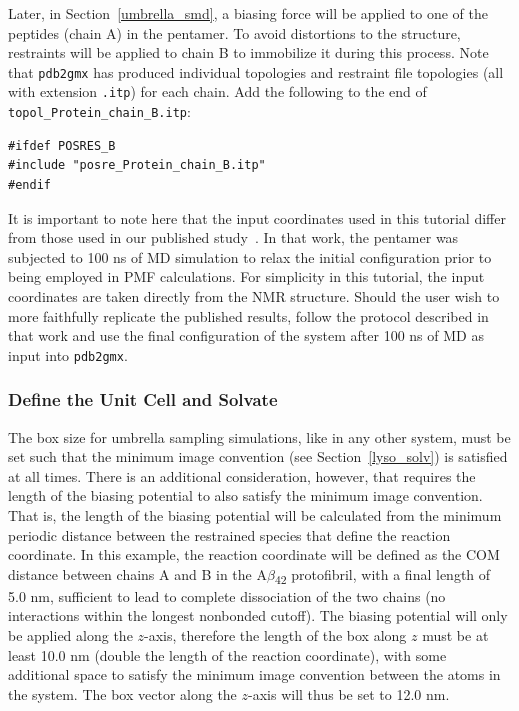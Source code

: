\documentclass[9pt,tutorial,pubversion]{livecoms}
\begin{document}
Later, in Section~\ref{umbrella_smd}, a biasing force will be applied to one of the peptides (chain A) in the pentamer. To avoid distortions to the structure, restraints will be applied to chain B to immobilize it during this process. Note that \texttt{pdb2gmx} has produced individual topologies and restraint file topologies (all with extension \texttt{.itp}) for each chain. Add the following to the end of \texttt{topol\_Protein\_chain\_B.itp}:

\begin{lstlisting}
#ifdef POSRES_B
#include "posre_Protein_chain_B.itp"
#endif
\end{lstlisting}

It is important to note here that the input coordinates used in this tutorial differ from those used in our published study~\cite{Lemkul2010}. In that work, the pentamer was subjected to 100 ns of MD simulation to relax the initial configuration prior to being employed in PMF calculations. For simplicity in this tutorial, the input coordinates are taken directly from the NMR structure. Should the user wish to more faithfully replicate the published results, follow the protocol described in that work and use the final configuration of the system after 100 ns of MD as input into \texttt{pdb2gmx}.

\subsubsection{Define the Unit Cell and Solvate} \label{umbrella_box}

The box size for umbrella sampling simulations, like in any other system, must be set such that the minimum image convention (see Section~\ref{lyso_solv}) is satisfied at all times. There is an additional consideration, however, that requires the length of the biasing potential to also satisfy the minimum image convention. That is, the length of the biasing potential will be calculated from the minimum periodic distance between the restrained species that define the reaction coordinate. In this example, the reaction coordinate will be defined as the COM distance between chains A and B in the A$\beta$\textsubscript{42} protofibril, with a final length of 5.0 nm, sufficient to lead to complete dissociation of the two chains (no interactions within the longest nonbonded cutoff). The biasing potential will only be applied along the $z$-axis, therefore the length of the box along $z$ must be at least 10.0 nm (double the length of the reaction coordinate), with some additional space to satisfy the minimum image convention between the atoms in the system. The box vector along the $z$-axis will thus be set to 12.0 nm.
\end{document}
